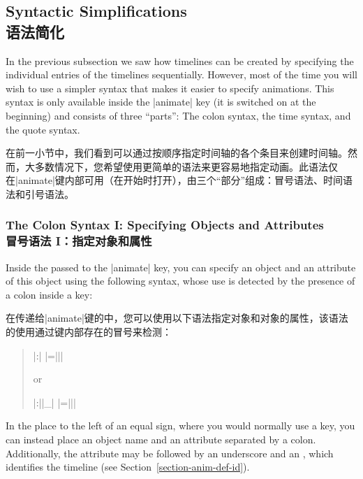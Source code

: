 \subsection{Syntactic Simplifications\\语法简化}
\label{section-anim-syntax-animate}

In the previous subsection we saw how timelines can be created by specifying
the individual entries of the timelines sequentially. However, most of the time
you will wish to use a simpler syntax that makes it easier to specify
animations. This syntax is only available inside the |animate| key (it is
switched on at the beginning) and consists of three ``parts'': The colon
syntax, the time syntax, and the quote syntax.

在前一小节中，我们看到可以通过按顺序指定时间轴的各个条目来创建时间轴。然而，大多数情况下，您希望使用更简单的语法来更容易地指定动画。此语法仅在|animate|键内部可用（在开始时打开），由三个“部分”组成：冒号语法、时间语法和引号语法。


\subsubsection{The Colon Syntax I: Specifying Objects and Attributes\\冒号语法 I：指定对象和属性}
\label{section-anim-syntax-obj}

Inside the  passed to the |animate| key, you can
specify an object and an attribute of this object using the following syntax,
whose use is detected by the presence of a colon inside a key:

在传递给|animate|键的中，您可以使用以下语法指定对象和对象的属性，该语法的使用通过键内部存在的冒号来检测：


\begin{quote}
  \normalfont
  |:|
  |={||}|

  or

  |:||_|
  |={||}|
\end{quote}
%
In the place to the left of an equal sign, where you would normally use a key,
you can instead place an object name and an attribute separated by a colon.
Additionally, the attribute may be followed by an underscore and an ,
which identifies the timeline (see Section~\ref{section-anim-def-id}).

